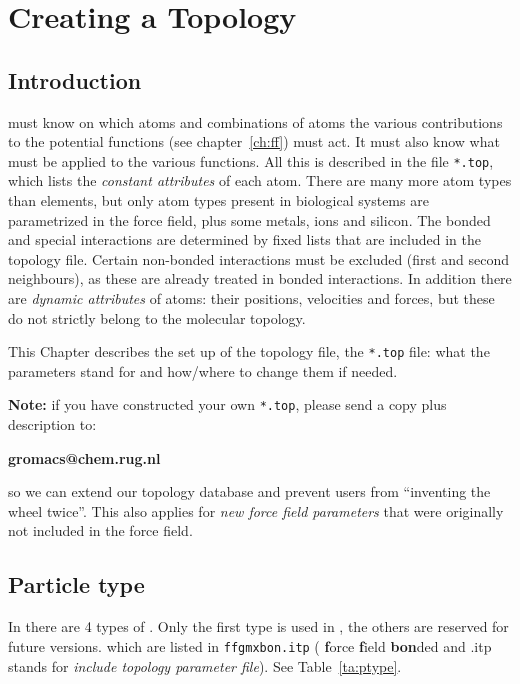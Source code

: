 \chapter{Creating a Topology}
\label{ch:top}
\section{Introduction}
{\gromacs} must know on which atoms and combinations of atoms the
various contributions to the potential functions (see
chapter~\ref{ch:ff}) must act. It must  
also know what  must be applied to the various
functions. All this is described in the {\em {}} file
\verb'*.top', which lists the {\em constant attributes} of each atom.
There are many more atom
types than elements, but only atom types present in biological 
systems are parametrized in the force field, plus some metals, ions and 
silicon. The bonded and special interactions are determined by fixed
lists that are included in the topology file. Certain non-bonded
interactions must be excluded (first and second neighbours), as these
are already treated in bonded interactions.  
In addition there are {\em dynamic attributes} of atoms: their
positions, velocities and forces, but these do not strictly belong to
the molecular topology.  

This Chapter describes the set up of the topology file, the
\verb'*.top' file: what the parameters stand for and how/where to
change them if needed. 

{\bf Note:} if you have constructed your own \verb'*.top', please
send a copy plus description to:
\centerline{\bf gromacs@chem.rug.nl}

so we can extend our topology database and prevent {\gromacs} users
from ``inventing the wheel twice''. This also applies for {\em new
force field parameters} that were originally not included in the
{\gromacs} force field.

\section{Particle type}
\label{sec:parttype}

In {\gromacs} there are 4 types of .  Only the
first type is used in {\gromacs} {\gmxver}, the others are reserved
for future versions. which are listed in \verb'ffgmxbon.itp' ({\bf
f}orce {\bf f}ield {\gromacs} {\bf bon}ded and .itp stands for {\em
include topology parameter file}). See Table~\ref{ta:ptype}.

